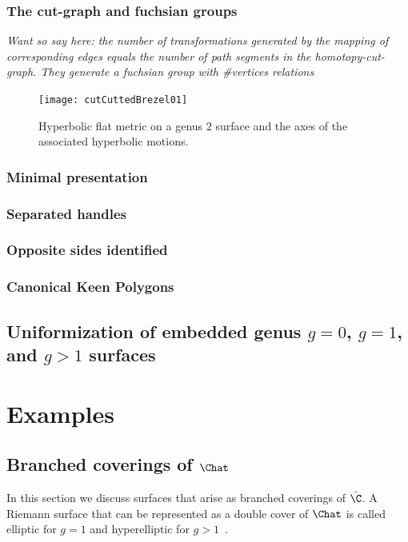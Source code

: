 \subsection{The cut-graph and fuchsian groups}
\emph{Want so say here: the number of transformations generated by the mapping of corresponding edges equals the number of path segments in the homotopy-cut-graph. They generate a fuchsian group with \#vertices relations}


\begin{figure}
\centering
\texttt{[image: cutCuttedBrezel01]}
\caption{Hyperbolic flat metric on a genus $2$ surface and the axes of the associated hyperbolic motions.}
\label{fig:axes_of_motion}
\end{figure}

\subsection{Minimal presentation}
\subsection{Separated handles}
\subsection{Opposite sides identified}
\subsection{Canonical Keen Polygons}

\section{Uniformization of embedded genus $g=0$, $g=1$, and $g>1$ surfaces}


\chapter{Examples}



\section{Branched coverings of $\Chat$}
In this section we discuss surfaces that arise as branched coverings of $\hat{\C}$. A Riemann surface that can be represented as a double cover of $\Chat$ is called elliptic for $g=1$ and hyperelliptic for $g>1$~\cite[p.~235]{Jost2007}. 

